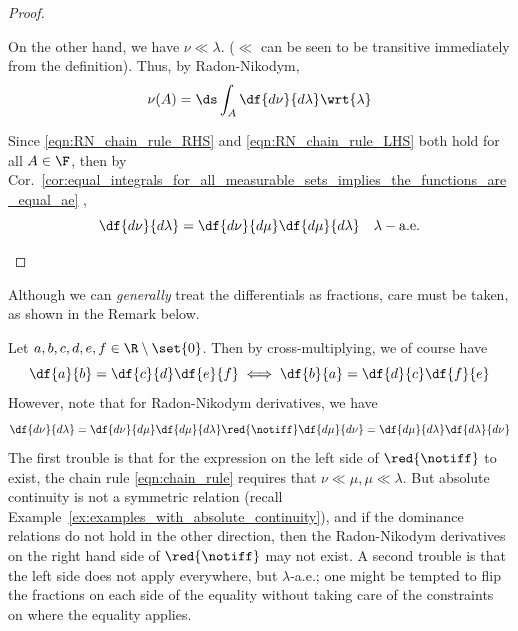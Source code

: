 \documentclass{article} %
\begin{document}
\begin{proof}
\begin{alphabate}
On the other hand, we have $\nu \ll \lambda$. ($\ll$ can be seen to be transitive immediately from the definition).  Thus, by Radon-Nikodym, 
\begin{align}
\nu(A) = \ds\int_A \df{d\nu}{d\lambda} \wrt{\lambda}
\label{eqn:RN_chain_rule_LHS}	
\end{align}

Since \eqref{eqn:RN_chain_rule_RHS}  and \eqref{eqn:RN_chain_rule_LHS} both hold for all $A \in \F$, then by Cor.~\ref{cor:equal_integrals_for_all_measurable_sets_implies_the_functions_are_equal_ae} , 
\[ \df{d\nu}{d\lambda} = \df{d\nu}{d\mu}  \df{d\mu}{d\lambda} \quad \lambda-\text{a.e.} \]	

\end{alphabate}
	
\end{proof}



Although we can \textit{generally} treat the differentials as fractions, care must be taken, as shown in the Remark below. 

\begin{remark}{}
Let $a,b,c,d,e,f \in \R \setminus \set{0}$. Then by cross-multiplying, we of course have
\[ \df{a}{b} = \df{c}{d} \df{e}{f} \iff \df{b}{a} = \df{d}{c} \df{f}{e} \]
However, note that for Radon-Nikodym derivatives, we have 
\[ \df{d\nu}{d\lambda} = \df{d\nu}{d\mu}  \df{d\mu}{d\lambda}   \red{\notiff} \df{d\mu}{d\nu} = \df{d\mu}{d\lambda}  \df{d\lambda}{d\nu} \]
The first trouble is that for the expression on the left side of $\red{\notiff}$ to exist, the chain rule \eqref{eqn:chain_rule} requires that $\nu \ll \mu, \mu \ll \lambda$.  But absolute continuity is not a symmetric relation (recall Example~\ref{ex:examples_with_absolute_continuity}), and if the dominance relations do not hold in the other direction, then the Radon-Nikodym derivatives on the right hand side of $\red{\notiff}$ may not exist.   A second trouble is that the left side does not apply everywhere, but $\lambda$-a.e.; one might be tempted to flip the fractions on each side of the equality without taking care of the constraints on where the equality applies.
\end{remark}
\end{document}
